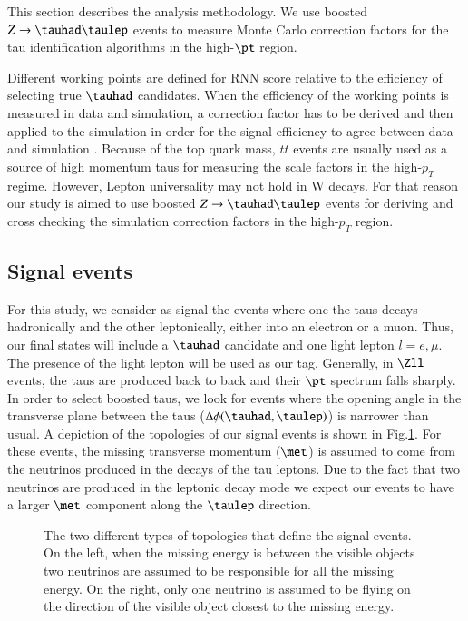 This section describes the analysis methodology. We use boosted $Z\to\tauhad\taulep$ events to measure Monte Carlo correction factors for the tau identification algorithms in the high-$\pt$ region.

Different working points are defined for RNN score relative to the efficiency of selecting true $\tauhad$ candidates. When the efficiency of the working points is measured in data and simulation, a correction factor has to be derived and then applied to the simulation in order for the signal efficiency to agree between data and simulation \cite{ATLAS:2017mpa}. Because of the top quark mass, $t\bar{t}$ events are usually used as a source of high momentum taus for measuring the scale factors in the high-$p_T$ regime. However, Lepton universality may not hold in W decays. For that reason our study is aimed to use boosted $Z\to\tauhad\taulep$ events for deriving and cross checking the simulation correction factors in the high-$p_T$ region.   
\subsection{Signal events}\label{signalevents}
For this study, we consider as signal the events where one the taus decays hadronically and the other leptonically, either into an electron or a muon. Thus, our final states will include a $\tauhad$ candidate and one light lepton $l=e,\mu$. The presence of the light lepton will be used as our tag. 
Generally, in $\Zll$ events, the taus are produced back to back and their $\pt$ spectrum falls sharply. In order to select boosted taus, we look for events where the opening angle in the transverse plane between the taus ($\Delta\phi(\tauhad,\taulep)$) is narrower than usual. A depiction of the topologies of our signal events is shown in Fig.\ref{Fig1}. For these events, the missing transverse momentum ($\met$) is assumed to come from the neutrinos produced in the decays of the tau leptons. Due to the fact that two neutrinos are produced in the leptonic decay mode we expect our events to have a larger $\met$ component along the $\taulep$ direction.
\begin{figure}[htbp]
	\centering
	\hfill
	\caption{The two different types of topologies that define the signal events. On the left, when the missing energy is between the visible objects two neutrinos are assumed to be responsible for all the missing energy. On the right, only one neutrino is assumed to be flying on the direction of the visible object closest to the missing energy.}
	\label{Fig1}
\end{figure}

